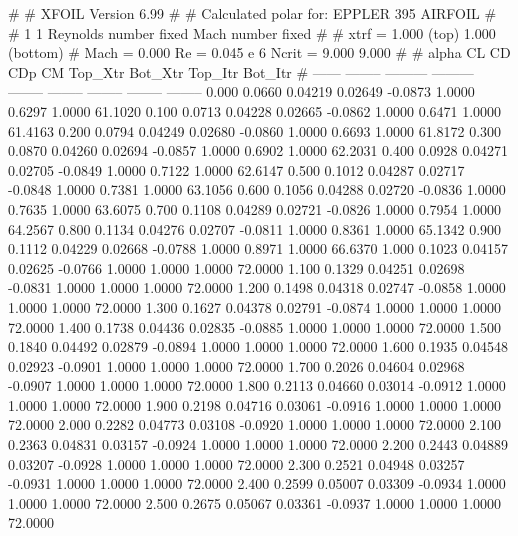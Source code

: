 #  
#       XFOIL         Version 6.99
#  
# Calculated polar for: EPPLER 395 AIRFOIL                              
#  
# 1 1 Reynolds number fixed          Mach number fixed         
#  
# xtrf =   1.000 (top)        1.000 (bottom)  
# Mach =   0.000     Re =     0.045 e 6     Ncrit =   9.000  9.000
#  
#   alpha    CL        CD       CDp       CM     Top_Xtr  Bot_Xtr  Top_Itr  Bot_Itr
#  ------ -------- --------- --------- -------- -------- -------- -------- --------
   0.000   0.0660   0.04219   0.02649  -0.0873   1.0000   0.6297   1.0000  61.1020
   0.100   0.0713   0.04228   0.02665  -0.0862   1.0000   0.6471   1.0000  61.4163
   0.200   0.0794   0.04249   0.02680  -0.0860   1.0000   0.6693   1.0000  61.8172
   0.300   0.0870   0.04260   0.02694  -0.0857   1.0000   0.6902   1.0000  62.2031
   0.400   0.0928   0.04271   0.02705  -0.0849   1.0000   0.7122   1.0000  62.6147
   0.500   0.1012   0.04287   0.02717  -0.0848   1.0000   0.7381   1.0000  63.1056
   0.600   0.1056   0.04288   0.02720  -0.0836   1.0000   0.7635   1.0000  63.6075
   0.700   0.1108   0.04289   0.02721  -0.0826   1.0000   0.7954   1.0000  64.2567
   0.800   0.1134   0.04276   0.02707  -0.0811   1.0000   0.8361   1.0000  65.1342
   0.900   0.1112   0.04229   0.02668  -0.0788   1.0000   0.8971   1.0000  66.6370
   1.000   0.1023   0.04157   0.02625  -0.0766   1.0000   1.0000   1.0000  72.0000
   1.100   0.1329   0.04251   0.02698  -0.0831   1.0000   1.0000   1.0000  72.0000
   1.200   0.1498   0.04318   0.02747  -0.0858   1.0000   1.0000   1.0000  72.0000
   1.300   0.1627   0.04378   0.02791  -0.0874   1.0000   1.0000   1.0000  72.0000
   1.400   0.1738   0.04436   0.02835  -0.0885   1.0000   1.0000   1.0000  72.0000
   1.500   0.1840   0.04492   0.02879  -0.0894   1.0000   1.0000   1.0000  72.0000
   1.600   0.1935   0.04548   0.02923  -0.0901   1.0000   1.0000   1.0000  72.0000
   1.700   0.2026   0.04604   0.02968  -0.0907   1.0000   1.0000   1.0000  72.0000
   1.800   0.2113   0.04660   0.03014  -0.0912   1.0000   1.0000   1.0000  72.0000
   1.900   0.2198   0.04716   0.03061  -0.0916   1.0000   1.0000   1.0000  72.0000
   2.000   0.2282   0.04773   0.03108  -0.0920   1.0000   1.0000   1.0000  72.0000
   2.100   0.2363   0.04831   0.03157  -0.0924   1.0000   1.0000   1.0000  72.0000
   2.200   0.2443   0.04889   0.03207  -0.0928   1.0000   1.0000   1.0000  72.0000
   2.300   0.2521   0.04948   0.03257  -0.0931   1.0000   1.0000   1.0000  72.0000
   2.400   0.2599   0.05007   0.03309  -0.0934   1.0000   1.0000   1.0000  72.0000
   2.500   0.2675   0.05067   0.03361  -0.0937   1.0000   1.0000   1.0000  72.0000
